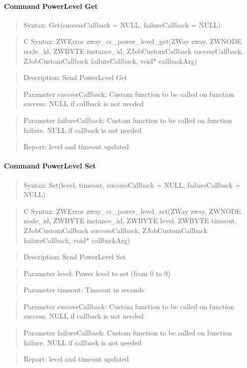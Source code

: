 \paragraph{Command PowerLevel Get}
\begin{quote}Syntax: Get(successCallback = NULL, failureCallback = NULL)\end{quote}
\begin{quote}C Syntax: ZWError zway\_cc\_power\_level\_get(ZWay zway, ZWNODE node\_id, ZWBYTE instance\_id, ZJobCustomCallback successCallback, ZJobCustomCallback failureCallback, void* callbackArg)\end{quote}
\begin{quote}Description: Send PowerLevel Get\end{quote}
\begin{quote}Parameter successCallback: Custom function to be called on function success. NULL if callback is not needed\end{quote}
\begin{quote}Parameter failureCallback: Custom function to be called on function failure. NULL if callback is not needed\end{quote}
\begin{quote}Report: level and timeout updated\end{quote}

\paragraph{Command PowerLevel Set}
\begin{quote}Syntax: Set(level, timeout, successCallback = NULL, failureCallback = NULL)\end{quote}
\begin{quote}C Syntax: ZWError zway\_cc\_power\_level\_set(ZWay zway, ZWNODE node\_id, ZWBYTE instance\_id, ZWBYTE level, ZWBYTE timeout, ZJobCustomCallback successCallback, ZJobCustomCallback failureCallback, void* callbackArg)\end{quote}
\begin{quote}Description: Send PowerLevel Set\end{quote}
\begin{quote}Parameter level: Power level to set (from 0 to 9)\end{quote}
\begin{quote}Parameter timeout: Timeout in seconds\end{quote}
\begin{quote}Parameter successCallback: Custom function to be called on function success. NULL if callback is not needed\end{quote}
\begin{quote}Parameter failureCallback: Custom function to be called on function failure. NULL if callback is not needed\end{quote}
\begin{quote}Report: level and timeout updated\end{quote}

